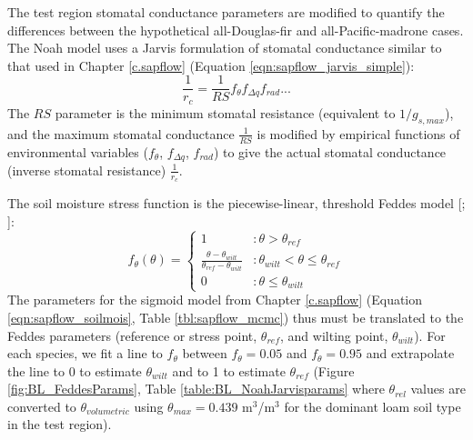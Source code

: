 The test region stomatal conductance parameters are modified to quantify the differences between the hypothetical all-Douglas-fir and all-Pacific-madrone cases.  The Noah model uses a Jarvis formulation of stomatal conductance similar to that used in Chapter \ref{c.sapflow} (Equation \ref{eqn:sapflow_jarvis_simple}):
\begin{equation}
\frac{1}{r_c} = \frac{1}{RS} f_{\theta} f_{\Delta q} f_{rad} ...
\end{equation}
The $RS$ parameter is the minimum stomatal resistance (equivalent to $1/g_{s,max}$), and the maximum stomatal conductance $\frac{1}{RS}$ is modified by empirical functions of environmental variables ($f_{\theta}$, $f_{\Delta q}$, $f_{rad}$) to give the actual stomatal conductance (inverse stomatal resistance) $\frac{1}{r_c}$.  

The soil moisture stress function is the piecewise-linear, threshold Feddes model [\cite{feddes}; \cite{chen2008observations}]:
\begin{displaymath}
   f_{\theta}(\theta) = \left\{
     \begin{array}{lr}
       1 & : \theta > \theta_{ref}\\
       \frac{\theta - \theta_{wilt}}{\theta_{ref} - \theta_{wilt}} & : \theta_{wilt} < \theta \leq \theta_{ref} \tag{\theequation}\\
       0 & : \theta \leq \theta_{wilt}
     \end{array}
   \right.
   \label{eqn:f_theta}
\end{displaymath} 
The parameters for the sigmoid model from Chapter \ref{c.sapflow} (Equation \ref{eqn:sapflow_soilmois}, Table \ref{tbl:sapflow_mcmc}) thus must be translated to the Feddes parameters (reference or stress point, $\theta_{ref}$, and wilting point, $\theta_{wilt}$).  For each species, we fit a line to $f_{\theta}$ between $f_{\theta}=0.05$ and $f_{\theta}=0.95$ and extrapolate the line to 0 to estimate $\theta_{wilt}$ and to 1 to estimate $\theta_{ref}$ (Figure \ref{fig:BL_FeddesParams}, Table \ref{table:BL_NoahJarvisparams} where $\theta_{rel}$ values are converted to $\theta_{volumetric}$ using $\theta_{max} = 0.439$ m$^3$/m$^3$ for the dominant loam soil type in the test region).


